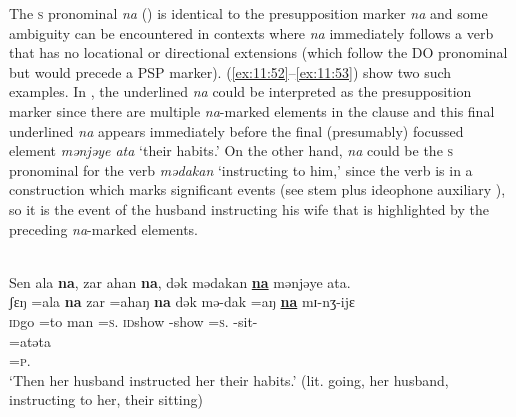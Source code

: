 The \textsc{s} \DO pronominal \textit{na} () is identical to the presupposition marker \textit{na} and some ambiguity can be encountered in contexts where \textit{na} immediately follows a verb that has no locational or directional extensions (which follow the DO pronominal but would precede a PSP marker). (\ref{ex:11:52}--\ref{ex:11:53}) show two such examples. In ,  the underlined \textit{na}  could be interpreted as the presupposition marker since there are multiple \textit{na}{}-marked elements in the clause and this final underlined \textit{na} appears immediately before the final (presumably) focussed element \textit{mənjəye ata} ‘their habits.’ On the other hand, \textit{na} could be  the \textsc{s} \DO pronominal for the verb \textit{mədakan} ‘instructing to him,’ since the verb is in a construction which marks significant events (see stem plus ideophone auxiliary ), so it is the event of the husband instructing his wife that is highlighted by the preceding \textit{na}-marked elements.

\newpage 
\ea \label{ex:11:52}
\\
Sen  ala  \textbf{na},  zar  ahan  \textbf{na},  dək  mədakan  \underline{\textbf{na}}  mənjəye  ata.\\
\gll  ʃɛŋ =ala       \textbf{na}  zar     =ahaŋ     \textbf{na}  dək        mə-dak  =aŋ    \underline{\textbf{na}}    mɪ-nʒ-ijɛ\\     
      \textsc{id}go =to   {\PSP}   man  =\textsc{s}.{\POSS}  {\PSP}   \textsc{id}show  {\NOM}-show =\textsc{s}.{\IO}  {\PSP}  {\NOM}{}-sit-{\CL}\\ 
      
      \medskip 
\gll =atəta \\
     =\textsc{p}.{\POSS}\\
\glt  ‘Then her husband instructed her their habits.’ (lit. going, her husband, instructing to her, their sitting)
\z

